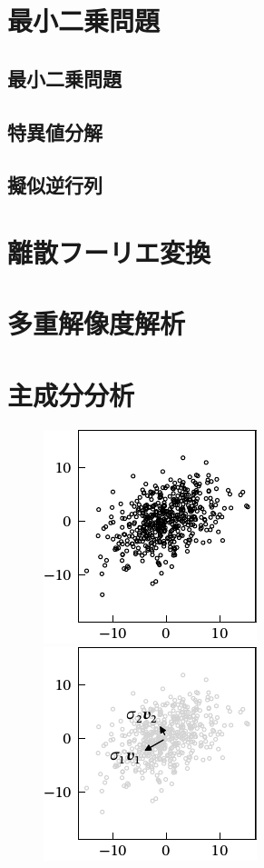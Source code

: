 \documentclass[../../main]{subfiles}
\begin{document}
\section{最小二乗問題}

\subsection{最小二乗問題}
\subsection{特異値分解}
\subsection{擬似逆行列}

\section{離散フーリエ変換}

\section{多重解像度解析}

\section{主成分分析}
\begin{figure}[htbp]
  \begin{minipage}{\linewidth/2}
    \centering
    \includegraphics{scatter.pdf}
  \end{minipage}%
  \begin{minipage}{\linewidth/2}
    \centering
    \includegraphics{pca.pdf}
  \end{minipage}
\end{figure}
\end{document}
